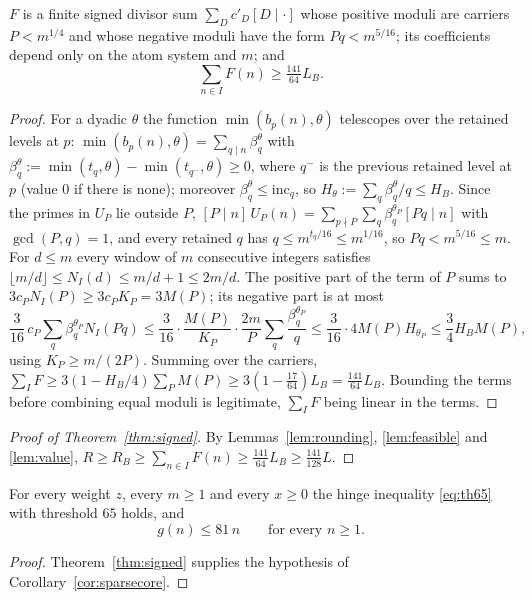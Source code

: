 \begin{lemma}\label{lem:value}
$F$ is a finite signed divisor sum $\sum_Dc'_D[D\mid\cdot]$ whose positive moduli are carriers $P<m^{1/4}$ and whose negative moduli
have the form $Pq<m^{5/16}$; its coefficients depend only on the atom system and $m$; and
\[
\sum_{n\in I}F(n)\ge\tfrac{141}{64}L_B .
\]
\end{lemma}
\begin{proof}
For a dyadic $\theta$ the function $\min(b_p(n),\theta)$ telescopes over the retained levels at $p$:
$\min(b_p(n),\theta)=\sum_{q\mid n}\beta^\theta_q$ with $\beta^\theta_q:=\min(t_q,\theta)-\min(t_{q^-},\theta)\ge0$, where $q^-$ is the
previous retained level at $p$ (value $0$ if there is none); moreover $\beta^\theta_q\le\mathrm{inc}_q$, so
$H_\theta:=\sum_q\beta^\theta_q/q\le H_B$. Since the primes in $U_P$ lie outside $P$,
$[P\mid n]\,U_P(n)=\sum_{p\nmid P}\sum_{q}\beta^{\theta_P}_q[Pq\mid n]$ with $\gcd(P,q)=1$, and every retained $q$ has
$q\le m^{t_q/16}\le m^{1/16}$, so $Pq<m^{5/16}\le m$. For $d\le m$ every window of $m$ consecutive integers satisfies
$\lfloor m/d\rfloor\le N_I(d)\le m/d+1\le2m/d$. The positive part of the term of $P$ sums to $3c_PN_I(P)\ge3c_PK_P=3M(P)$; its negative
part is at most
\[
\frac3{16}\,c_P\sum_q\beta^{\theta_P}_qN_I(Pq)\le\frac3{16}\cdot\frac{M(P)}{K_P}\cdot\frac{2m}P\sum_q\frac{\beta^{\theta_P}_q}q
\le\frac3{16}\cdot4M(P)H_{\theta_P}\le\frac34H_BM(P),
\]
using $K_P\ge m/(2P)$. Summing over the carriers,
$\sum_IF\ge3(1-H_B/4)\sum_PM(P)\ge3(1-\tfrac{17}{64})L_B=\tfrac{141}{64}L_B$. Bounding the terms before combining equal moduli is
legitimate, $\sum_IF$ being linear in the terms.
\end{proof}

\begin{proof}[Proof of Theorem~\ref{thm:signed}]
By Lemmas~\ref{lem:rounding}, \ref{lem:feasible} and \ref{lem:value},
$R\ge R_B\ge\sum_{n\in I}F(n)\ge\tfrac{141}{64}L_B\ge\tfrac{141}{128}L$.
\end{proof}

\begin{theorem}\label{thm:81}
For every weight $z$, every $m\ge1$ and every $x\ge0$ the hinge inequality \eqref{eq:th65} with threshold $65$ holds, and
\[
g(n)\le81\,n\qquad\text{for every }n\ge1 .
\]
\end{theorem}
\begin{proof}
Theorem~\ref{thm:signed} supplies the hypothesis of Corollary~\ref{cor:sparsecore}.
\end{proof}

